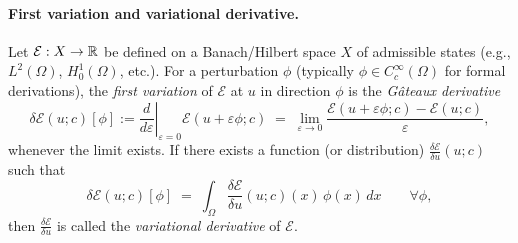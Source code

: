 \documentclass[11pt]{article}
\begin{document}
\paragraph{First variation and variational derivative.}
Let $\mathcal E: X\to{{\mathbb{R}}}$ be defined on a Banach/Hilbert space $X$ of admissible states (e.g., $L^2(\Omega)$, $H_0^1(\Omega)$, etc.).
For a perturbation $\phi$ (typically $\phi\in C_c^\infty(\Omega)$ for formal derivations), the \emph{first variation} of $\mathcal E$ at $u$ in direction $\phi$ is the \textit{G\^ateaux derivative}
\begin{equation}
\label{eq:first-variation}
\delta \mathcal E(u;c)[\phi]
:=
\left.\frac{d}{d\varepsilon}\right|_{\varepsilon=0}
\mathcal E(u+\varepsilon\phi;c)
\;=\;
\lim_{\varepsilon\to 0}
\frac{\mathcal E(u+\varepsilon\phi;c)-\mathcal E(u;c)}{\varepsilon},
\end{equation}
whenever the limit exists.
If there exists a function (or distribution) $\frac{\delta \mathcal E}{\delta u}(u;c)$ such that
\begin{equation}
\label{eq:variational-derivative}
\delta \mathcal E(u;c)[\phi]
\;=\;
\int_\Omega \frac{\delta \mathcal E}{\delta u}(u;c)(x)\,\phi(x)\,dx
\qquad \forall \phi,
\end{equation}
then $\frac{\delta \mathcal E}{\delta u}$ is called the \emph{variational derivative} of $\mathcal E$.
\end{document}
